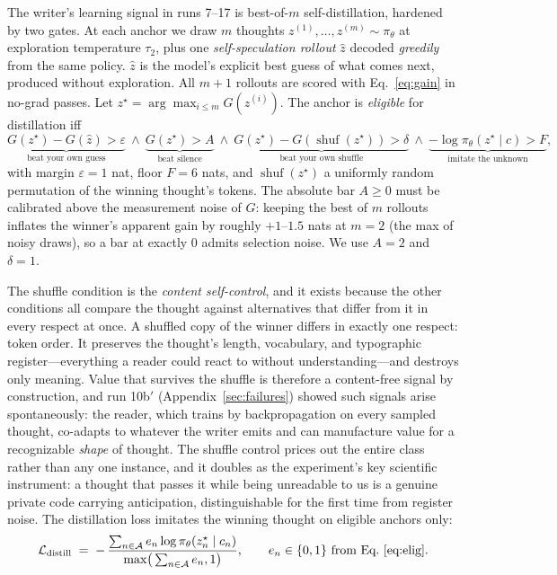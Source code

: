 \documentclass{article} %
\newcommand{\ctx}{c}
\newcommand{\thought}{z}
\newcommand{\spec}{\hat{\thought}}
\newcommand{\best}{\thought^{\star}}
\newcommand{\policy}{\pi_\theta}
\newcommand{\gain}{G}
\begin{document}
The writer's learning signal in runs 7--17 is best-of-$m$ self-distillation, hardened by two gates. At each anchor we draw $m$ thoughts $\thought^{(1)},\dots,\thought^{(m)} \sim \policy$ at exploration temperature $\tau_2$, plus one \emph{self-speculation rollout} $\spec$ decoded \emph{greedily} from the same policy. $\spec$ is the model's explicit best guess of what comes next, produced without exploration. All $m{+}1$ rollouts are scored with Eq.~\eqref{eq:gain} in no-grad passes. Let $\best = \arg\max_{i \le m} \gain(\thought^{(i)})$. The anchor is \emph{eligible} for distillation iff
\begin{equation}
    \underbrace{\gain(\best) - \gain(\spec) > \varepsilon}_{\text{beat your own guess}}
    ~\wedge~
    \underbrace{\gain(\best) > A}_{\text{beat silence}}
    ~\wedge~
    \underbrace{\gain(\best) - \gain(\operatorname{shuf}(\best)) > \delta}_{\text{beat your own shuffle}}
    ~\wedge~
    \underbrace{-\log \policy(\best \mid \ctx) > F}_{\text{imitate the unknown}},
    \label{eq:elig}
\end{equation}
with margin $\varepsilon = 1$ nat, floor $F = 6$ nats, and $\operatorname{shuf}(\best)$ a uniformly random permutation of the winning thought's tokens. The absolute bar $A \ge 0$ must be calibrated above the measurement noise of $\gain$: keeping the best of $m$ rollouts inflates the winner's apparent gain by roughly $+1$--$1.5$ nats at $m = 2$ (the max of noisy draws), so a bar at exactly $0$ admits selection noise. We use $A = 2$ and $\delta = 1$.

The shuffle condition is the \emph{content self-control}, and it exists because the other conditions all compare the thought against alternatives that differ from it in every respect at once. A shuffled copy of the winner differs in exactly one respect: token order. It preserves the thought's length, vocabulary, and typographic register---everything a reader could react to without understanding---and destroys only meaning. Value that survives the shuffle is therefore a content-free signal by construction, and run 10b$'$ (Appendix~\ref{sec:failures}) showed such signals arise spontaneously: the reader, which trains by backpropagation on every sampled thought, co-adapts to whatever the writer emits and can manufacture value for a recognizable \emph{shape} of thought. The shuffle control prices out the entire class rather than any one instance, and it doubles as the experiment's key scientific instrument: a thought that passes it while being unreadable to us is a genuine private code carrying anticipation, distinguishable for the first time from register noise. The distillation loss imitates the winning thought on eligible anchors only:
\begin{equation}
    \mathcal{L}_{\mathrm{distill}} \;=\; - \, \frac{\sum_{n \in \mathcal{A}} e_n \log \policy(\best_n \mid \ctx_n)}{\max\!\big(\sum_{n \in \mathcal{A}} e_n , 1\big)},
    \qquad e_n \in \{0,1\} \text{ from Eq.~\eqref{eq:elig}}.
    \label{eq:distill}
\end{equation}
\end{document}
